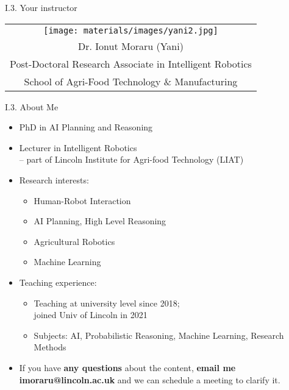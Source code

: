 \documentclass[handout]{beamer}
\newcommand{\strong}[1]{\textbf{\color{teal} #1}}
\newcommand{\stronger}[1]{\textbf{\color{purple} #1}}
\begin{document}
\begin{frame}{I.3. Your instructor}
\begin{center}
\begin{tabular}{c}
\texttt{[image: materials/images/yani2.jpg]} \\
Dr. Ionut Moraru (Yani) \\
Post-Doctoral Research Associate in Intelligent Robotics \\
School of Agri-Food Technology \& Manufacturing \\
\end{tabular}
\end{center}
\end{frame}
\begin{frame}{I.3. About Me}
\begin{itemize}
\item PhD in AI Planning and Reasoning
\item Lecturer in Intelligent Robotics \\
 -- part of Lincoln Institute for Agri-food Technology (LIAT)
\item Research interests: 
	\begin{itemize}
	\item Human-Robot Interaction
	\item AI Planning, High Level Reasoning
	\item Agricultural Robotics
	\item Machine Learning
	\end{itemize}
\item Teaching experience:
	\begin{itemize}
	\item Teaching at university level since 2018;\\
	joined Univ of Lincoln in 2021
	\item Subjects: AI, Probabilistic Reasoning, Machine Learning, Research Methods\end{itemize}
 \item If you have \strong{any questions} about the content, \strong{email me}  \stronger{imoraru@lincoln.ac.uk} and we can schedule a meeting to clarify it.
\end{itemize}
\end{frame}
\end{document}
